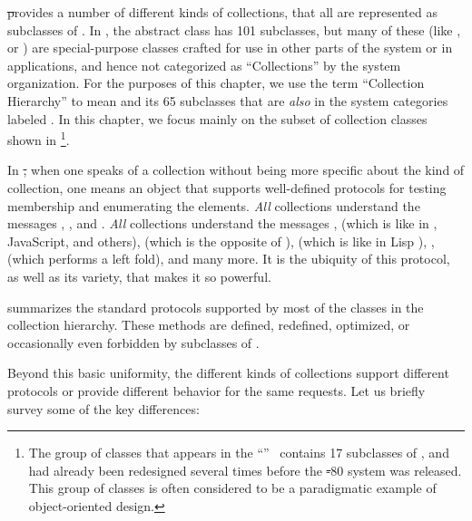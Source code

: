 \documentclass[a4paper,10pt,twoside]{book}
\begin{document}
\st provides a number of different kinds of collections, that all are represented as subclasses of .
In \squeak, the abstract class  has 101 subclasses, but many of these (like \mbox{,} or ) are special-purpose classes crafted for use in other parts of the system or in applications, and hence not categorized as ``Collections'' by the system organization.
For the purposes of this chapter, we use the term ``Collection Hierarchy'' to mean  and its 65 subclasses that are \emph{also} in the system categories labeled .
In this chapter, we focus mainly on the subset of collection classes shown in \footnote{The group of classes that appears in the ``''~\cite{Gold83a} contains 17 subclasses of , and had already been redesigned several times before the \st-80 system was released.
This group of classes is often considered to be a paradigmatic example of object-oriented design.}.

In \st, when one speaks of a collection without being more specific about the kind of collection, one means an object that supports well-defined protocols for testing membership and enumerating the elements.
\emph{All} collections understand the  messages \mbox{,} , and \mbox{.}
\emph{All} collections understand the  messages ,  (which is like  in , JavaScript, and others),  (which is the opposite of ),  (which is like  in Lisp \etc), ,  (which performs a left fold), and many more.
It is the ubiquity of this protocol, as well as its variety, that makes it so powerful.

 summarizes the standard protocols supported by most of the classes in the collection hierarchy.
These methods are defined, redefined, optimized, or occasionally even forbidden by subclasses of .

Beyond this basic uniformity, the different kinds of collections support different protocols or provide different behavior for the same requests.
Let us briefly survey some of the key differences:
\end{document}
